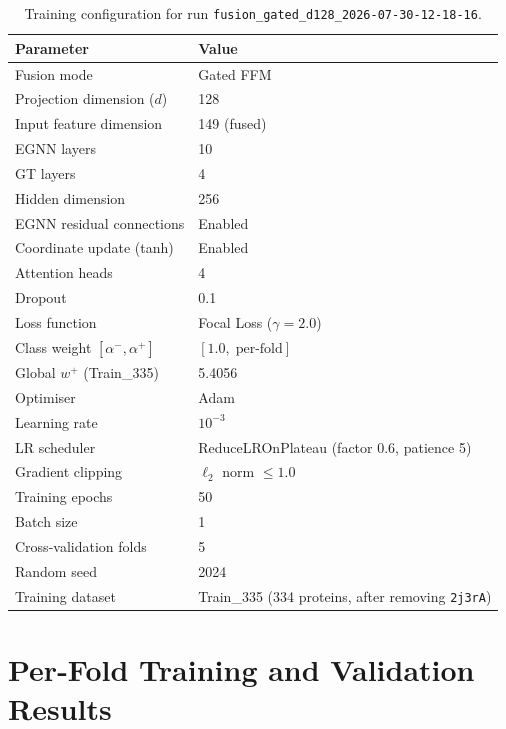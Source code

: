 \documentclass[11pt,a4paper]{article}
\begin{document}
\begin{table}[h]
\centering
\caption{Training configuration for run \texttt{fusion\_gated\_d128\_2026-07-30-12-18-16}.}
\label{tab:config}
\begin{tabular}{ll}
\toprule
\textbf{Parameter} & \textbf{Value} \\
\midrule
Fusion mode               & Gated FFM \\
Projection dimension ($d$) & 128 \\
Input feature dimension   & 149 (fused) \\
EGNN layers               & 10 \\
GT layers                 & 4 \\
Hidden dimension          & 256 \\
EGNN residual connections & Enabled \\
Coordinate update (tanh)  & Enabled \\
Attention heads           & 4 \\
Dropout                   & 0.1 \\
Loss function             & Focal Loss ($\gamma = 2.0$) \\
Class weight $[\alpha^-, \alpha^+]$ & $[1.0,\; \text{per-fold}]$ \\
Global $w^+$ (Train\_335) & 5.4056 \\
Optimiser                 & Adam \\
Learning rate             & $10^{-3}$ \\
LR scheduler              & ReduceLROnPlateau (factor 0.6, patience 5) \\
Gradient clipping         & $\ell_2$ norm $\le 1.0$ \\
Training epochs           & 50 \\
Batch size                & 1 \\
Cross-validation folds    & 5 \\
Random seed               & 2024 \\
Training dataset          & Train\_335 (334 proteins, after removing \texttt{2j3rA}) \\
\bottomrule
\end{tabular}
\end{table}

\section{Per-Fold Training and Validation Results}
\end{document}
